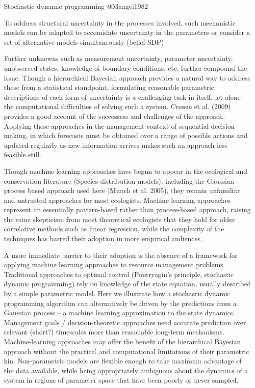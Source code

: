\documentclass[author-year, review]{elsarticle} %
\begin{document}
Stochastic dynamic programming @Mangel1982

To address structural uncertainty in the processes involved, such
mechanistic models can be adapted to accomidate uncertainty in the
parameters or consider a set of alternative models simultaneously
(belief SDP)

Further unknowns such as measurement uncertainty, parameter uncertainty,
unobserved states, knowledge of boundary conditions, etc. further
compound the issue. Though a hierarchical Bayesian approach provides a
natural way to address these from a statistical standpoint, formulating
reasonable parametric descriptions of each form of uncertainty is a
challenging task in itself, let alone the computational difficulties of
solving such a system. Cressie et al. (2009) provides a good account of
the successess and challenges of the approach. Applying these approaches
in the management context of sequential decision making, in which
forecasts must be obtained over a range of possible actions and updated
regularly as new information arrives makes such an approach less
feasible still.

Though machine learning approaches have begun to appear in the
ecological and conservation literature (Species distribution models),
including the Gaussian process based approach used here (Munch et al.
2005), they remain unfamiliar and untrusted approaches for most
ecologists. Machine learning approaches represent an essentially
pattern-based rather than process-based approach, raising the same
skepticism from most theoretical ecologists that they hold for older
correlative methods such as linear regression, while the complexity of
the techniques has barred their adoption in more empirical audiences.

A more immediate barrier to their adoption is the absence of a framework
for applying machine learning approaches to resource management
problems. Traditional approaches to optimal control (Pontryagin's
principle, stochastic dynamic programming) rely on knowledge of the
state equation, usually described by a simple parametric model. Here we
illustrate how a stochastic dynamic programming algorithm can
alternatively be driven by the predictions from a Gaussian process -- a
machine learning approximation to the state dynamics.\\

Management goals / decision-theoretic approaches need accurate
prediction over relevant (short?) timescales more than reasonable
long-term mechanisms. Machine-learning approaches may offer the benefit
of the hierarchical Bayesian approach without the practical and
computational limitations of their parametric kin. Non-parametric models
are flexible enough to take maximum advantage of the data available,
while being appropriately ambiguous about the dynamics of a system in
regions of parameter space that have been poorly or never sampled.
\end{document}
